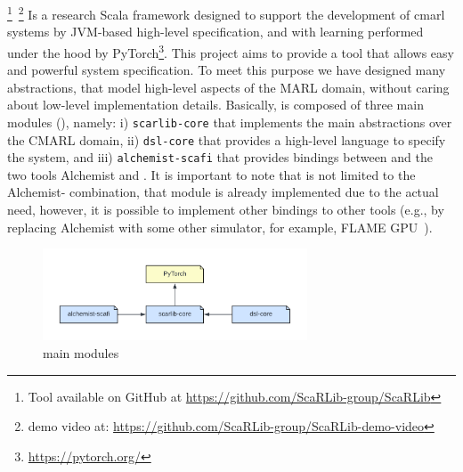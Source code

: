 \scarlib{} \footnote{Tool available on GitHub at \url{https://github.com/ScaRLib-group/ScaRLib}}~\footnote{demo video at: \url{https://github.com/ScaRLib-group/ScaRLib-demo-video}} Is a research Scala framework designed to support
the development of \ac{cmarl} systems by JVM-based high-level specification, and with learning performed under the hood by PyTorch\footnote{\url{https://pytorch.org/}}.
%
This project aims to provide a tool that allows easy and powerful system specification.
%
To meet this purpose we have designed many abstractions, that model high-level aspects of the MARL domain, 
 without caring about low-level implementation details.
Basically, \scarlib{} is composed of three main modules (), namely: 
    i) \texttt{scarlib-core} that implements the main abstractions over the CMARL domain,
    ii) \texttt{dsl-core} that provides a high-level language to specify the system, and
    iii) \texttt{alchemist-scafi} that provides bindings between \scarlib{} and the two tools Alchemist and \scafi{}.
    It is important to note that \scarlib{} is not limited to the Alchemist-\scafi{} combination, that module is 
    already implemented due to the actual need, however, it is possible to implement other bindings to other tools
    (e.g., by replacing Alchemist with some other simulator, for example, FLAME GPU~\cite{flame}).
\begin{figure}[t]
    \centering
    \includegraphics[width=0.7\textwidth]{papers/coordination2023/imgs/scarlib-modules.pdf}
    \caption{\scarlib{} main modules}
    \label{coordination2023:fig:modules}
\end{figure}

